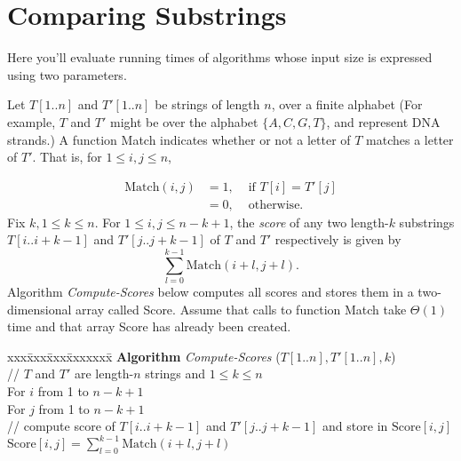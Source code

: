 \documentclass[11pt]{article}
\newcommand{\Match}{\mbox{Match}}
\newcommand{\Score}{\mbox{Score}}
\begin{document}
\section{Comparing Substrings}
\label{sec-5}
Here you'll evaluate running times of algorithms whose
input size is expressed using two parameters.

Let $T[1..n]$ and $T'[1..n]$ be strings of length $n$, over a finite alphabet
(For example, $T$ and $T'$ might be over the alphabet $\{A,C,G,T\}$,
and represent DNA strands.)
A function Match indicates whether or not a letter of $T$ matches a
letter of $T'$.  That is, for $1 \le i,j \le n$, 

\[
\begin{array}{lll}
\Match(i,j) & = 1, & \mbox{ if } T[i] = T'[j] \\
         & = 0, & \mbox{ otherwise}.
\end{array}
\]
Fix $k, 1 \le k \le n$.
For $1 \le i,j \le n-k+1$, the \emph{score} of any two
length-$k$ substrings $T[i..i+k-1]$ and $T'[j..j+k-1]$ of $T$ and $T'$
respectively is given by
\[
\sum_{l = 0}^{k-1} \Match(i+l,j+l).
\]
Algorithm \emph{Compute-Scores} below computes all scores and stores them
in a two-dimensional array called Score.  Assume that calls to
function Match take $\Theta(1)$ time and that array Score has
already been created.

\begin{tabbing}
xxx\=xxx\=xxx\=xxxxxxx\= \kill
{\bf Algorithm} {\em Compute-Scores} ($T[1..n],T'[1..n],k$)\\
     \> // $T$ and $T'$ are length-$n$ strings and $1\le k \le n$ \\
     \> For $i$ from 1 to $n-k+1$ \\
     \>\> For $j$ from 1 to $n-k+1$ \\
     \>\>\> // compute score of $T[i..i+k-1]$ and $T'[j..j+k-1]$ and store in $\Score[i,j]$ \\
     \>\>\>  $\Score[i,j] = \sum_{l = 0}^{k-1} \Match(i+l,j+l)$ \\
\end{tabbing}
\end{document}
